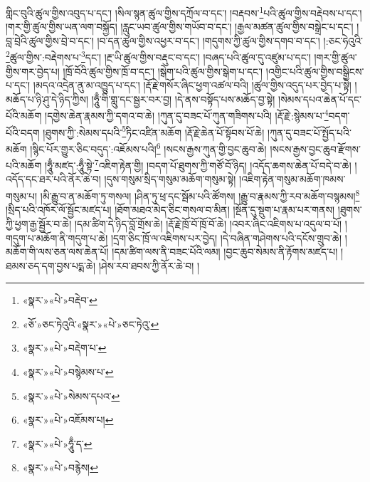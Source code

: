 གླིང་བུའི་ཚུལ་གྱིས་འབུད་པ་དང་། །སིལ་སྙན་ཚུལ་གྱིས་དཀྲོལ་བ་དང་། །བརྡབས་\footnote{«སྣར་»«པེ་»བརྡེབ་}པའི་ཚུལ་གྱིས་བརྡེབས་པ་དང་། །གར་གྱི་ཚུལ་གྱིས་ཡན་ལག་བསྐྱོད། །རླུང་ཡབ་ཚུལ་གྱིས་གཡོབ་བ་དང་། །རྒྱལ་མཚན་ཚུལ་གྱིས་བསྒྲེང་པ་དང་། །བླ་བྲེའི་ཚུལ་གྱིས་བྲེ་བ་དང་། །བ་དན་ཚུལ་གྱིས་འཕྱར་བ་དང་། །གདུགས་ཀྱི་ཚུལ་གྱིས་དགབ་བ་དང་། །:ཅང་ཧེའུའི་\footnote{«ཅོ་»ཅང་ཏེའུའི་«སྣར་»«པེ་»ཅང་ཏེའུ་}ཚུལ་གྱིས་:བརྡེགས་པ་\footnote{«སྣར་»«པེ་»བརྡེག་པ་}དང་། །རྔ་ཡི་ཚུལ་གྱིས་བརྡུང་བ་དང་། །བཞད་པའི་ཚུལ་དུ་འཛུམ་པ་དང་། །གར་གྱི་ཚུལ་གྱིས་གར་བྱེད་པ། །ཁྲོ་བོའི་ཚུལ་གྱིས་ཁྲོ་བ་དང་། །སྒེག་པའི་ཚུལ་གྱིས་སྒེག་པ་དང་། །འགྱིང་པའི་ཚུལ་གྱིས་བསྒྱིངས་པ་དང་། །མདའ་འདྲེན་ནུ་མ་འཁྱུད་པ་དང་། །རྡོ་རྗེ་གསོར་ཞིང་ཕྱག་འཚལ་བའི། །ཚུལ་གྱིས་འདུད་པར་བྱེད་པ་སྟེ། །མཆོད་པ་ཉི་ཤུ་དེ་ཉིད་ཀྱིས། །ཧཱུྃ་གི་གླུ་དང་སྦྱར་བར་བྱ། །དེ་ནས་བསྟོད་པས་མཆོད་བྱ་སྟེ། །སེམས་དཔའ་ཆེན་པོ་དང་པོའི་མཆོག །དགྱེས་ཆེན་རྣམས་ཀྱི་དགའ་བ་ཆེ། །ཀུན་དུ་བཟང་པོ་ཀུན་གཟིགས་པའི། །རྡོ་རྗེ་:སྙེམས་པ་\footnote{«སྣར་»«པེ་»བསྙེམས་པ་}བདག་པོའི་བདག །ཐུགས་ཀྱི་:སེམས་དཔའི་\footnote{«སྣར་»«པེ་»སེམས་དཔའ་}ཏིང་འཛིན་མཆོག །རྡོ་རྗེ་ཆེན་པོ་སྟོབས་པོ་ཆེ། །ཀུན་དུ་བཟང་པོ་སྤྱོད་པའི་མཆོག །སྙིང་པོར་གྱུར་ཅིང་བདུད་:འཇོམས་པའི།\footnote{«སྣར་»«པེ་»འཇོམས་པ།} །སངས་རྒྱས་ཀུན་གྱི་བྱང་ཆུབ་ཆེ། །སངས་རྒྱས་བྱང་ཆུབ་རྫོགས་པའི་མཆོག །ཧཱུྃ་མཛད་:ཧཱུྃ་སྟེ་\footnote{«སྣར་»«པེ་»ཧཱུྃ་ད་}འཇིག་རྟེན་གྱི། །བདག་པོ་ཐུགས་ཀྱི་གཙོ་བོ་ཉིད། །འདོད་ཆགས་ཆེན་པོ་བདེ་བ་ཆེ། །འདོད་དང་ཐར་པའི་ནོར་ཆེ་བ། །དུས་གསུམ་སྲིད་གསུམ་མཆོག་གསུམ་སྟེ། །འཇིག་རྟེན་གསུམ་མཆོག་ཁམས་གསུམ་པ། །མི་རྒྱུ་བ་ན་མཆོག་ཏུ་གསལ། །ཤིན་ཏུ་ཕྲ་དང་སྦོམ་པའི་ཚོགས། །རྒྱུ་བ་རྣམས་ཀྱི་རབ་མཆོག་བསྙམས།\footnote{«སྣར་»«པེ་»བརྙེས།} །སྲིད་པའི་འཁོར་ལོ་སྦྱོང་མཛད་པ། །ཐོག་མཐའ་མེད་ཅིང་གསལ་བ་མིན། །སྔོན་དུ་སྡུག་པ་རྣམ་པར་གནས། །ཐུགས་ཀྱི་ཕྱག་རྒྱ་སྦྱོར་བ་ཆེ། །དམ་ཚིག་དེ་ཉིད་བློ་གྲོས་ཆེ། །རྡོ་རྗེ་ཁྲོ་བོ་ཁྲོ་བོ་ཆེ། །འབར་ཞིང་འཇིགས་པ་འདུལ་བ་པོ། །གདུག་པ་མཆོག་ནི་གདུག་པ་ཆེ། །དྲག་ཅིང་ཁྲོ་ལ་འཇིགས་པར་བྱེད། །དེ་བཞིན་གཤེགས་པའི་དངོས་གྲུབ་ཆེ། །མཆོག་གི་ལས་ཅན་ལས་ཆེན་པོ། །དམ་ཚིག་ལས་ནི་བཟང་པོའི་ལམ། །བྱང་ཆུབ་སེམས་ནི་རྟོགས་མཛད་པ། །ཐམས་ཅད་དག་བྱས་པདྨ་ཆེ། །ཤེས་རབ་ཐབས་ཀྱི་ནོར་ཆེ་བ། །
